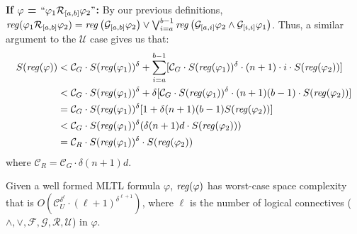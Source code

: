 \documentclass[runningheads]{llncs}
\renewcommand{\phi}{\varphi}
\begin{document}
  \textbf{If $\phi$ = $``\phi_1 \mathcal{R}_{[a, b]} \phi_2"$:}
        By our previous definitions, $\text{\emph{reg}}(\phi_1 \mathcal{R}_{[a,b]} \phi_2) =  \text{\emph{reg}}\left(\mathcal{G}_{[a,b]}\phi_2\right) \lor \bigvee_{i=a}^{b-1} \text{\emph{reg}}\left(\mathcal{G}_{[a,i]}\phi_2 \land \mathcal{G}_{[i, i]} \phi_1\right)$. Thus, a similar argument to the $\mathcal{U}$ case gives us that: 
        \begin{align*}
            S(\text{\emph{reg}}(\phi)) &< 
            \mathcal{C}_G \cdot S(\text{\emph{reg}}(\phi_1))^
            \delta + \sum_{i = a}^{b-1} [\mathcal{C}_G \cdot S(\text{\emph{reg}}(\phi_1))^
            \delta \cdot (n+1)\cdot i \cdot S(\text{\emph{reg}}(\phi_2))] \\
            &< \mathcal{C}_G \cdot S(\text{\emph{reg}}(\phi_1))^
            \delta + \delta[\mathcal{C}_G \cdot S(\text{\emph{reg}}(\phi_1))^
            \delta \cdot (n+1)(b-1) \cdot S(\text{\emph{reg}}(\phi_2))] \\
            &= \mathcal{C}_G \cdot S(\text{\emph{reg}}(\phi_1))^
            \delta [1 + \delta(n+1)(b-1)S(\text{\emph{reg}}(\phi_2))] \\
            &< \mathcal{C}_G \cdot S(\text{\emph{reg}}(\phi_1))^
            \delta (\delta(n+1)d \cdot S(\text{\emph{reg}}(\phi_2))) \\
            &= \mathcal{C}_R \cdot S(\text{\emph{reg}}(\phi_1))^\delta \cdot S(\text{\emph{reg}}(\phi_2))
        \end{align*}
        where $\mathcal{C}_R = \mathcal{C}_G \cdot \delta (n+1)d$. \\
\begin{theorem}
Given a well formed MLTL formula $\phi$, $\text{\emph{reg}}(\phi)$ has worst-case space complexity that is $O(\mathcal{C}_U^{\delta ^ \ell} \cdot (\ell + 1)^{\delta^{\ell + 1}})$, where $\ell$ is the number of logical connectives ($\land, \lor, \mathcal{F}, \mathcal{G}, \mathcal{R}, \mathcal{U}$) in $\phi$. 
\end{theorem}
\end{document}
